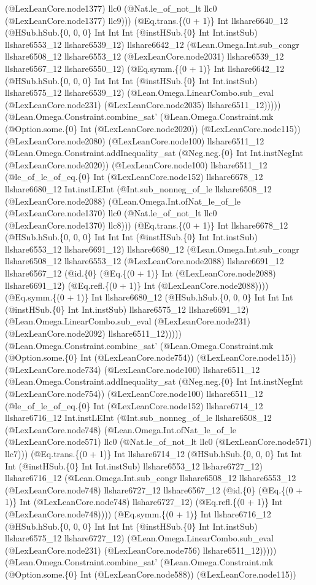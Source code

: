 \documentclass[11pt]{article}
\begin{document}
(@LexLeanCore.node1377) llc0 (@Nat.le\_of\_not\_lt llc0 (@LexLeanCore.node1377) llc9))) (@Eq.trans.\{(0 + 1)\} Int llshare6640\_12 (@HSub.hSub.\{0, 0, 0\} Int Int Int (@instHSub.\{0\} Int Int.instSub) llshare6553\_12 llshare6539\_12) llshare6642\_12 (@Lean.Omega.Int.sub\_congr llshare6508\_12 llshare6553\_12 (@LexLeanCore.node2031) llshare6539\_12 llshare6567\_12 llshare6550\_12) (@Eq.symm.\{(0 + 1)\} Int llshare6642\_12 (@HSub.hSub.\{0, 0, 0\} Int Int Int (@instHSub.\{0\} Int Int.instSub) llshare6575\_12 llshare6539\_12) (@Lean.Omega.LinearCombo.sub\_eval (@LexLeanCore.node231) (@LexLeanCore.node2035) llshare6511\_12))))) (@Lean.Omega.Constraint.combine\_sat' (@Lean.Omega.Constraint.mk (@Option.some.\{0\} Int (@LexLeanCore.node2020)) (@LexLeanCore.node115)) (@LexLeanCore.node2080) (@LexLeanCore.node100) llshare6511\_12 (@Lean.Omega.Constraint.addInequality\_sat (@Neg.neg.\{0\} Int Int.instNegInt (@LexLeanCore.node2020)) (@LexLeanCore.node100) llshare6511\_12 (@le\_of\_le\_of\_eq.\{0\} Int (@LexLeanCore.node152) llshare6678\_12 llshare6680\_12 Int.instLEInt (@Int.sub\_nonneg\_of\_le llshare6508\_12 (@LexLeanCore.node2088) (@Lean.Omega.Int.ofNat\_le\_of\_le (@LexLeanCore.node1370) llc0 (@Nat.le\_of\_not\_lt llc0 (@LexLeanCore.node1370) llc8))) (@Eq.trans.\{(0 + 1)\} Int llshare6678\_12 (@HSub.hSub.\{0, 0, 0\} Int Int Int (@instHSub.\{0\} Int Int.instSub) llshare6553\_12 llshare6691\_12) llshare6680\_12 (@Lean.Omega.Int.sub\_congr llshare6508\_12 llshare6553\_12 (@LexLeanCore.node2088) llshare6691\_12 llshare6567\_12 (@id.\{0\} (@Eq.\{(0 + 1)\} Int (@LexLeanCore.node2088) llshare6691\_12) (@Eq.refl.\{(0 + 1)\} Int (@LexLeanCore.node2088)))) (@Eq.symm.\{(0 + 1)\} Int llshare6680\_12 (@HSub.hSub.\{0, 0, 0\} Int Int Int (@instHSub.\{0\} Int Int.instSub) llshare6575\_12 llshare6691\_12) (@Lean.Omega.LinearCombo.sub\_eval (@LexLeanCore.node231) (@LexLeanCore.node2092) llshare6511\_12))))) (@Lean.Omega.Constraint.combine\_sat' (@Lean.Omega.Constraint.mk (@Option.some.\{0\} Int (@LexLeanCore.node754)) (@LexLeanCore.node115)) (@LexLeanCore.node734) (@LexLeanCore.node100) llshare6511\_12 (@Lean.Omega.Constraint.addInequality\_sat (@Neg.neg.\{0\} Int Int.instNegInt (@LexLeanCore.node754)) (@LexLeanCore.node100) llshare6511\_12 (@le\_of\_le\_of\_eq.\{0\} Int (@LexLeanCore.node152) llshare6714\_12 llshare6716\_12 Int.instLEInt (@Int.sub\_nonneg\_of\_le llshare6508\_12 (@LexLeanCore.node748) (@Lean.Omega.Int.ofNat\_le\_of\_le (@LexLeanCore.node571) llc0 (@Nat.le\_of\_not\_lt llc0 (@LexLeanCore.node571) llc7))) (@Eq.trans.\{(0 + 1)\} Int llshare6714\_12 (@HSub.hSub.\{0, 0, 0\} Int Int Int (@instHSub.\{0\} Int Int.instSub) llshare6553\_12 llshare6727\_12) llshare6716\_12 (@Lean.Omega.Int.sub\_congr llshare6508\_12 llshare6553\_12 (@LexLeanCore.node748) llshare6727\_12 llshare6567\_12 (@id.\{0\} (@Eq.\{(0 + 1)\} Int (@LexLeanCore.node748) llshare6727\_12) (@Eq.refl.\{(0 + 1)\} Int (@LexLeanCore.node748)))) (@Eq.symm.\{(0 + 1)\} Int llshare6716\_12 (@HSub.hSub.\{0, 0, 0\} Int Int Int (@instHSub.\{0\} Int Int.instSub) llshare6575\_12 llshare6727\_12) (@Lean.Omega.LinearCombo.sub\_eval (@LexLeanCore.node231) (@LexLeanCore.node756) llshare6511\_12))))) (@Lean.Omega.Constraint.combine\_sat' (@Lean.Omega.Constraint.mk (@Option.some.\{0\} Int (@LexLeanCore.node588)) (@LexLeanCore.node115)) 
\end{document}
